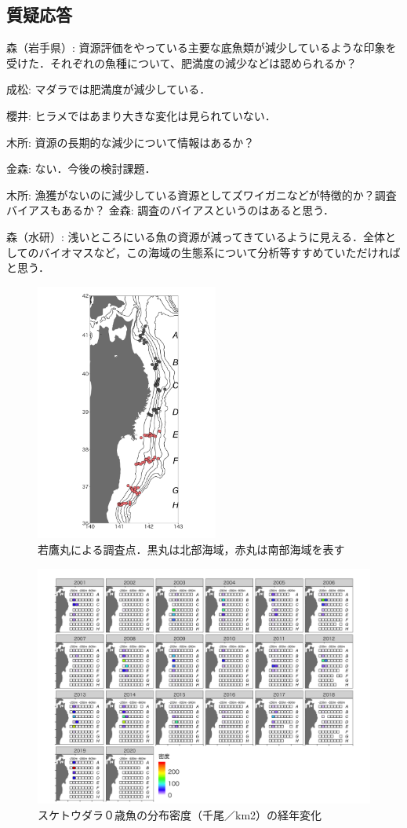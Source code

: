 \documentclass[11pt]{article} %
\begin{document}
\begin{linenumbers}
\section{質疑応答}
森（岩手県）: 資源評価をやっている主要な底魚類が減少しているような印象を受けた．それぞれの魚種について、肥満度の減少などは認められるか？

成松: マダラでは肥満度が減少している．

櫻井: ヒラメではあまり大きな変化は見られていない．

木所: 資源の長期的な減少について情報はあるか？

金森: ない．今後の検討課題．

木所: 漁獲がないのに減少している資源としてズワイガニなどが特徴的か？調査バイアスもあるか？
金森: 調査のバイアスというのはあると思う．

森（水研）: 浅いところにいる魚の資源が減ってきているように見える．全体としてのバイオマスなど，この海域の生態系について分析等すすめていただければと思う．

\begin{figure}[h]
  \centering
  \includegraphics[width = 6cm]{fig1.png}
  \caption{若鷹丸による調査点．黒丸は北部海域，赤丸は南部海域を表す}
\end{figure}

\begin{figure}[h]
  \centering
  \includegraphics[width = 14cm]{スケトウダラ０＋dens.png}
  \caption{スケトウダラ０歳魚の分布密度（千尾／km2）の経年変化}
\end{figure}


\end{linenumbers}
\end{document}

